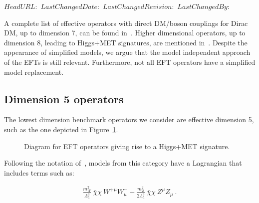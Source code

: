\svnidlong
{$HeadURL: $}
{$LastChangedDate: $}
{$LastChangedRevision: $}
{$LastChangedBy: $}


A complete list of effective operators with direct DM/boson couplings for
Dirac DM, up to dimension 7, can be found in~\cite{Cotta:2012nj, Carpenter:2012rg, Crivellin:2015wva}. 
Higher dimensional operators, up to dimension 8, leading to Higgs+MET signatures,
are mentioned in~\cite{Carpenter:2012rg, Berlin:2014cfa}.
Despite the appearance of simplified models, we argue that
the model independent approach of the EFTs is still relevant.
Furthermore, not all EFT operators have a simplified model
replacement.


\subsection{Dimension 5 operators}
\label{sub:EW_EFT_Dim5}

The lowest dimension benchmark operators we consider are effective dimension 5,
such as the one depicted in Figure~\ref{fig:modelMonoHEFT}.  

\begin{figure}[!htb]
	\centering
	\textwidth
	\begin{feynmandiagram}[modelMonoHEFT]
	\end{feynmandiagram}
	\caption{Diagram for EFT operators giving rise to a Higgs+MET signature.}
	\label{fig:modelMonoHEFT}
\end{figure}

Following the notation of~\cite{Carpenter:2012rg},  models
from this category have a Lagrangian that includes terms such as:

\begin{eqnarray}
\frac{m_W^2}{\Lambda_5^3} ~\bar{\chi} \chi ~W^{+ \mu} W^{-}_\mu
+ \frac{m_Z^2}{2 \Lambda_5^3} ~ \bar{\chi} \chi ~ Z^\mu Z_\mu ~.
\end{eqnarray}

